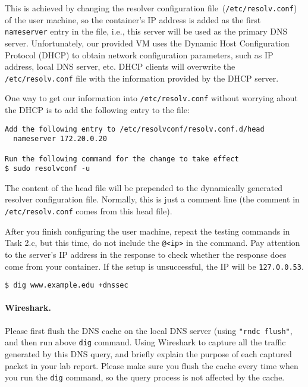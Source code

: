 This is achieved by changing
the resolver configuration file~(\texttt{/etc/resolv.conf}) of the user machine,
so the container's IP address is added as the first \texttt{nameserver} entry in the file, i.e.,
this server will be used as the primary DNS server.
Unfortunately, our provided VM uses the Dynamic Host Configuration Protocol (DHCP) to obtain
network configuration parameters, such as IP address, local DNS server, etc.
DHCP clients will overwrite the \texttt{/etc/resolv.conf} file with the information
provided by the DHCP server.

One way to get our information into \texttt{/etc/resolv.conf} without worrying about
the DHCP is to add the following entry to the 
file:


\begin{lstlisting}
Add the following entry to /etc/resolvconf/resolv.conf.d/head
  nameserver 172.20.0.20

Run the following command for the change to take effect
$ sudo resolvconf -u
\end{lstlisting}

The content of the head file will be prepended to the dynamically generated resolver
configuration file. Normally, this is just a comment line (the comment in
\texttt{/etc/resolv.conf} comes from this head file).


After you finish configuring the user machine, repeat
the testing commands in Task 2.c, but this time, do not
include the \texttt{@<ip>} in the command. Pay attention to
the server's IP address in the response to check whether the response does
come from your container. If the setup is unsuccessful,
the IP will be \texttt{127.0.0.53}.

\begin{lstlisting}
$ dig www.example.edu +dnssec
\end{lstlisting}

\paragraph{Wireshark.} Please first flush the DNS cache on the local DNS server (using 
\texttt{"rndc flush"}, and then run above \texttt{dig} command. Using 
Wireshark to capture all the traffic generated by this DNS query, and briefly explain
the purpose of each captured packet in your lab report.  Please make sure you flush the 
cache every time when you run the \texttt{dig} command, so the query process is not 
affected by the cache. 




